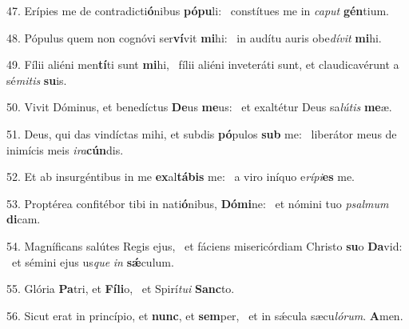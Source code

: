 47. Erípies me de contradicti\textbf{ó}nibus \textbf{pó}\textbf{pu}li: \ast\  constítues me in \textit{ca}\textit{put} \textbf{gén}tium.\

48. Pópulus quem non cognóvi ser\textbf{ví}vit \textbf{mi}hi: \ast\  in audítu auris obe\textit{dí}\textit{vit} \textbf{mi}hi.\

49. Fílii aliéni men\textbf{tí}ti sunt \textbf{mi}hi, \ast\  fílii aliéni inveteráti sunt, et claudicavérunt a sé\textit{mi}\textit{tis} \textbf{su}is.\

50. Vivit Dóminus, et benedíctus \textbf{De}us \textbf{me}us: \ast\  et exaltétur Deus sa\textit{lú}\textit{tis} \textbf{me}æ.\

51. Deus, qui das vindíctas mihi, et subdis \textbf{pó}pulos \textbf{sub} me: \ast\  liberátor meus de inimícis meis \textit{i}\textit{ra}\textbf{cún}dis.\

52. Et ab insurgéntibus in me \textbf{ex}al\textbf{tá}\textbf{bis} me: \ast\  a viro iníquo e\textit{rí}\textit{pi}\textbf{es} me.\

53. Proptérea confitébor tibi in nati\textbf{ó}nibus, \textbf{Dó}\textbf{mi}ne: \ast\  et nómini tuo \textit{psal}\textit{mum} \textbf{di}cam.\

54. Magníficans salútes Regis ejus, \dag\  et fáciens misericórdiam Christo \textbf{su}o \textbf{Da}vid: \ast\  et sémini ejus us\textit{que} \textit{in} \textbf{sǽ}culum.\

55. Glória \textbf{Pa}tri, et \textbf{Fí}\textbf{li}o, \ast\  et Spirí\textit{tu}\textit{i} \textbf{Sanc}to.\

56. Sicut erat in princípio, et \textbf{nunc}, et \textbf{sem}per, \ast\  et in sǽcula sæcu\textit{ló}\textit{rum}. \textbf{A}men.\

